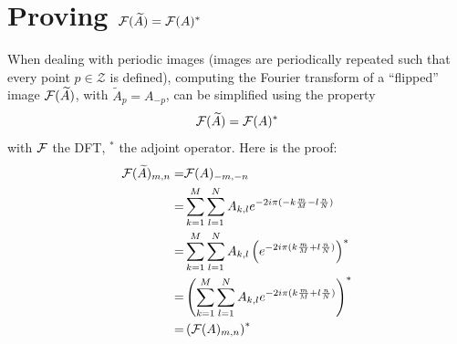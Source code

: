 \FloatBarrier

\section{Proving ${\mathcal F}(\widetilde{A}) = {\mathcal F}(A)^*$}\label{sec_proof_fourier_flip_adjoint}
When dealing with periodic images (images are periodically repeated such that every point $p \in \mathcal{Z}$ is defined), computing the Fourier transform of a “flipped” image ${\mathcal F}(\widetilde{A})$, with $\widetilde{A}_p = A_{-p}$, can be simplified using the property
\begin{equation*}
{\mathcal F}(\widetilde{A}) = {\mathcal F}(A)^*
\end{equation*}
with ${\mathcal F}$ the \ac{DFT}, $^*$ the adjoint operator. Here is the proof:
\begin{align*}
{\mathcal F}({\widetilde{A}})_{m,n} =& {\mathcal F}(A)_{-m,-n} \\
=& \sum_{k=1}^M \sum_{l=1}^N A_{k,l} e^{-2i\pi (-k\frac{m}{M}-l \frac{n}{N})}\\
=& \sum_{k=1}^M \sum_{l=1}^N A_{k,l} \left( e^{-2i\pi (k\frac{m}{M}+l \frac{n}{N})} \right)^*\\
=& \left( \sum_{k=1}^M \sum_{l=1}^N A_{k,l} e^{-2i\pi (k\frac{m}{M}+l \frac{n}{N})} \right)^*\\
=& \left( {\mathcal F}(A)_{m,n} \right)^*
\end{align*}



\printglossary
{\let\clearpage\relax \printacronyms}
\printbibliography[title=References]


